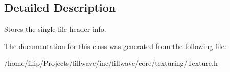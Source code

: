 \subsection{Detailed Description}
Stores the single file header info. 

The documentation for this class was generated from the following file\+:\begin{DoxyCompactItemize}
\item 
/home/filip/\+Projects/fillwave/inc/fillwave/core/texturing/Texture.\+h\end{DoxyCompactItemize}
